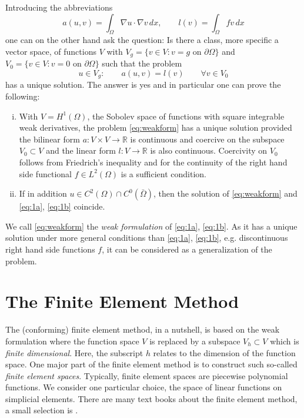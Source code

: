 \documentclass[a4paper,12pt]{article}
\begin{document}
Introducing the abbreviations
\begin{equation}
a(u,v) = \int_\Omega \nabla u \cdot \nabla v \,dx, \qquad l(v) = \int_\Omega fv \,dx
\end{equation}
one can on the other hand ask the question: Is there a class,
more specific a vector space, of functions $V$ with $V_g=\{v\in V : 
\text{$v=g$ on $\partial\Omega$}\}$ and $V_0=\{v\in V : 
\text{$v=0$ on $\partial\Omega$}\}$ such that
the problem
\begin{equation}
u \in V_g :\qquad a(u,v) = l(v) \qquad \forall v\in V_0 \label{eq:weakform}
\end{equation}
has a unique solution. The answer is yes and in particular one can prove the following:
\begin{enumerate}[i)]
\item With $V=H^1(\Omega)$, the Sobolev space of functions with square integrable
weak derivatives, the problem \eqref{eq:weakform} has a unique solution provided
the bilinear form $a : V\times V \to \mathbb{R}$ is continuous and coercive on the 
subspace $V_0\subset V$ and the linear form $l: V \to \mathbb{R}$ is also continuous. 
Coercivity on $V_0$ follows from Friedrich's inequality and for the continuity of the right hand
side functional $f\in L^2(\Omega)$ is a sufficient condition.
\item If in addition $u\in C^2(\Omega)\cap C^0(\bar\Omega)$, then the solution
of \eqref{eq:weakform} and \eqref{eq:1a}, \eqref{eq:1b} coincide.
\end{enumerate}
We call \eqref{eq:weakform} the {\em weak formulation} of \eqref{eq:1a}, \eqref{eq:1b}.
As it has a unique solution under more general conditions than \eqref{eq:1a}, \eqref{eq:1b},
e.g. discontinuous right hand side functions $f$, it can be considered as a generalization
of the problem.

\section{The Finite Element Method}

The (conforming) finite element method, in a nutshell, is based on the weak formulation where
the function space $V$ is replaced by a subspace $V_h\subset V$ 
which is {\em finite dimensional}. Here, the subscript $h$ relates to the dimension of the
function space. One major part of the finite element method is to construct such
so-called {\em finite element spaces}.
Typically, finite element spaces are piecewise polynomial functions.
We consider one particular choice, the space of linear functions on simplicial elements.
There are many text books about the finite element method,
a small selection is
\cite{Eriksson,Ern,Ciarlet,Braess,Brenner,Elman2005,GR,WHElliptisch,RannacherII,BastianII}.
\end{document}
